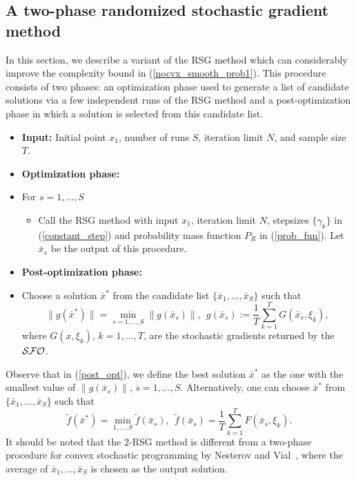 \documentclass[final]{siamltex}
\newcommand{\beq}{\begin{equation}}
\newcommand{\eeq}{\end{equation}}
\def\eqnok#1{(\ref{#1})}
\def\vgap{\vspace*{.1in}}
\def\SFO{{\cal SFO}}
\begin{document}
\subsection{A two-phase randomized stochastic gradient method} \label{sec_2RSG}
In this section, we describe a variant of the RSG method which can considerably improve the complexity
bound in \eqnok{nocvx_smooth_prob1}. This procedure consists of two phases: an optimization phase used to
generate a list of candidate solutions via a few independent runs of the RSG method
and a post-optimization phase in which a solution is selected
from this candidate list.

\vgap

\begin{itemize}
\item [] {\bf Input:}
Initial point $x_1$, number of runs $S$, iteration limit $N$, and sample size $T$.
\item [] {\bf Optimization phase:}
\item [] \hspace{0.1in} For $s = 1, \ldots, S$
\begin{itemize}
	\item [] Call the RSG method with input $x_1$,
iteration limit $N$, stepsizes $\{\gamma_k\}$ in \eqnok{constant_step} and
probability mass function $P_{R}$ in \eqnok{prob_fun}. Let $\bar x_s$ be
the output of this procedure.
\end{itemize}
\item [] {\bf Post-optimization phase:}
\item[] \hspace{0.1in} Choose a solution $\bar x^*$ from the candidate
list $\{\bar x_1, \ldots, \bar x_S\}$ such that
\beq \label{post_opt}
\|g(\bar x^*)\| = \min_{s = 1, \ldots, S} \|g(\bar x_s)\|, \ \
g(\bar x_s) := \frac{1}{T} \sum_{k=1}^T G(\bar x_s, \xi_k),
\eeq
where $G(x, \xi_k)$, $k = 1, \ldots, T$, are the stochastic gradients
returned by the $\SFO$.
\end{itemize}

Observe that in \eqnok{post_opt}, we define the best solution $\bar x^*$ as the one with the smallest
value of $\|g(\bar x_s)\|$, $s = 1, \ldots, S$. Alternatively, one can choose
$\bar x^*$ from $\{\bar x_1, \ldots, \bar x_S\}$ such that
\beq \label{post_opt2}
\tilde f(\bar x^*) = \min_{1, \ldots, S} \tilde f(\bar x_s), \ \
\tilde f(\bar x_s) = \frac{1}{T} \sum_{k=1}^T F(\bar x_s, \xi_k).
\eeq
It should be noted that the $2$-RSG method is different from
a two-phase procedure for convex stochastic programming by Nesterov and Vial~\cite{NesVia00},
where the average of $\bar x_1, \ldots, \bar x_S$ is chosen as the output solution.
\end{document}
